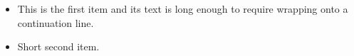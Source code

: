 \begin{itemize}
  \item This is the first item and its
  text is long enough to require
  wrapping onto a continuation line.
  \item Short second item.
\end{itemize}
